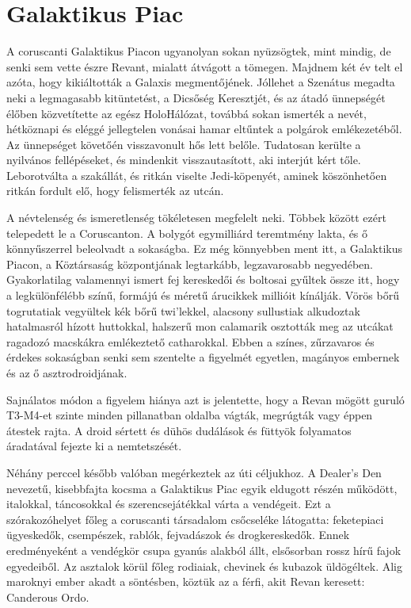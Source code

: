 \documentclass{thesis-ekf}
\theoremstyle{definition}
\begin{document}
\section{Galaktikus Piac}
A coruscanti Galaktikus Piacon ugyanolyan sokan nyüzsögtek, mint mindig, de senki sem
vette észre Revant, mialatt átvágott a tömegen. Majdnem két év telt el azóta, hogy kikiáltották
a Galaxis megmentőjének. Jóllehet a Szenátus megadta neki a legmagasabb kitüntetést, a
Dicsőség Keresztjét, és az átadó ünnepségét élőben közvetítette az egész HoloHálózat,
továbbá sokan ismerték a nevét, hétköznapi és eléggé jellegtelen vonásai hamar eltűntek a
polgárok emlékezetéből. Az ünnepséget követőén visszavonult hős lett belőle. Tudatosan
kerülte a nyilvános fellépéseket, és mindenkit visszautasított, aki interjút kért tőle. Leborotválta
a szakállát, és ritkán viselte Jedi-köpenyét, aminek köszönhetően ritkán fordult elő, hogy
felismerték az utcán.

A névtelenség és ismeretlenség tökéletesen megfelelt neki. Többek között ezért telepedett le
a Coruscanton. A bolygót egymilliárd teremtmény lakta, és ő könnyűszerrel beleolvadt a
sokaságba. Ez még könnyebben ment itt, a Galaktikus Piacon, a Köztársaság központjának
legtarkább, legzavarosabb negyedében. Gyakorlatilag valamennyi ismert fej kereskedői és
boltosai gyűltek össze itt, hogy a legkülönfélébb színű, formájú és méretű árucikkek millióit
kínálják. Vörös bőrű togrutatiak vegyültek kék bőrű twi’lekkel, alacsony sullustiak alkudoztak
hatalmasról hízott huttokkal, halszerű mon calamarik osztották meg az utcákat ragadozó
macskákra emlékeztető catharokkal. Ebben a színes, zűrzavaros és érdekes sokaságban senki
sem szentelte a figyelmét egyetlen, magányos embernek és az ő asztrodroidjának.

Sajnálatos módon a figyelem hiánya azt is jelentette, hogy a Revan mögött guruló T3-M4-et
szinte minden pillanatban oldalba vágták, megrúgták vagy éppen átestek rajta. A droid sértett
és dühös dudálások és füttyök folyamatos áradatával fejezte ki a nemtetszését.

Néhány perccel később valóban megérkeztek az úti céljukhoz. A Dealer’s Den nevezetű,
kisebbfajta kocsma a Galaktikus Piac egyik eldugott részén működött, italokkal, táncosokkal és
szerencsejátékkal várta a vendégeit. Ezt a szórakozóhelyet főleg a coruscanti társadalom
csőcseléke látogatta: feketepiaci ügyeskedők, csempészek, rablók, fejvadászok és
drogkereskedők. Ennek eredményeként a vendégkör csupa gyanús alakból állt, elsősorban
rossz hírű fajok egyedeiből. Az asztalok körül főleg rodiaiak, chevinek és kubazok üldögéltek.
Alig maroknyi ember akadt a söntésben, köztük az a férfi, akit Revan keresett: Canderous
Ordo.
\end{document}
